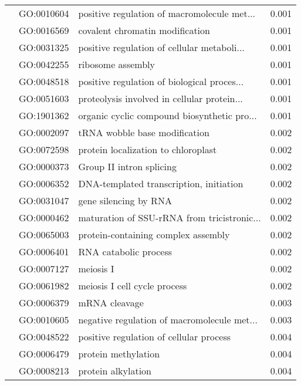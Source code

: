 \begin{longtable}{lllr}
   & GO:0010604 &  positive regulation of macromolecule met... &         0.001 \\
   & GO:0016569 &              covalent chromatin modification &         0.001 \\
   & GO:0031325 &  positive regulation of cellular metaboli... &         0.001 \\
   & GO:0042255 &                            ribosome assembly &         0.001 \\
   & GO:0048518 &  positive regulation of biological proces... &         0.001 \\
   & GO:0051603 &  proteolysis involved in cellular protein... &         0.001 \\
   & GO:1901362 &  organic cyclic compound biosynthetic pro... &         0.001 \\
   & GO:0002097 &                tRNA wobble base modification &         0.002 \\
   & GO:0072598 &          protein localization to chloroplast &         0.002 \\
   & GO:0000373 &                     Group II intron splicing &         0.002 \\
   & GO:0006352 &      DNA-templated transcription, initiation &         0.002 \\
   & GO:0031047 &                        gene silencing by RNA &         0.002 \\
   & GO:0000462 &  maturation of SSU-rRNA from tricistronic... &         0.002 \\
   & GO:0065003 &          protein-containing complex assembly &         0.002 \\
   & GO:0006401 &                        RNA catabolic process &         0.002 \\
   & GO:0007127 &                                    meiosis I &         0.002 \\
   & GO:0061982 &                 meiosis I cell cycle process &         0.002 \\
   & GO:0006379 &                                mRNA cleavage &         0.003 \\
   & GO:0010605 &  negative regulation of macromolecule met... &         0.003 \\
   & GO:0048522 &      positive regulation of cellular process &         0.004 \\
   & GO:0006479 &                          protein methylation &         0.004 \\
   & GO:0008213 &                           protein alkylation &         0.004 \\

\end{longtable}
